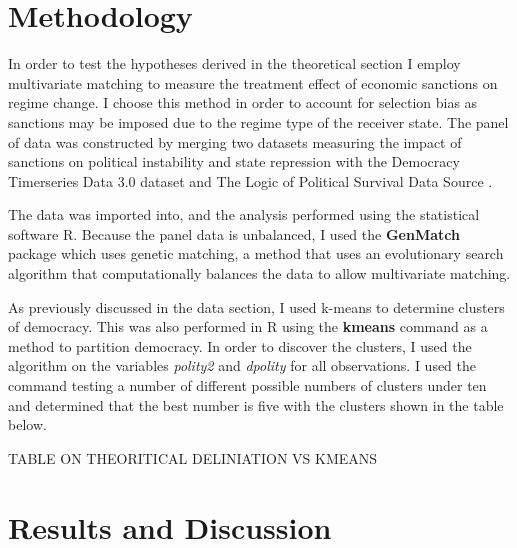 \documentclass[a4paper]{article}\usepackage[]{graphicx}\usepackage[]{color}
\begin{document}
\section*{\large{Methodology}}
In order to test the hypotheses derived in the theoretical section I employ multivariate matching to measure the treatment effect of economic sanctions on regime change. I choose this method in order to account for selection bias as sanctions may be imposed due to the regime type of the receiver state. The panel of data was constructed by merging two datasets measuring the impact of sanctions on political instability \citep{marinov2005economic} and state repression \citep{wood2008hand} with the Democracy Timerseries Data 3.0 dataset \citep{norris2008driving} and The Logic of Political Survival Data Source \citep{smith2005logic}. 
\par
The data was imported into, and the analysis performed using the statistical software R. Because the panel data is unbalanced, I used the \textbf{GenMatch} package which uses genetic matching, a method that uses an evolutionary search algorithm that computationally balances the data to allow multivariate matching\citep{diamond2013genetic}. 
\par
As previously discussed in the data section, I used k-means to determine clusters of democracy. This was also performed in R using the \textbf{kmeans} command as a method to partition democracy. In order to discover the clusters, I used the algorithm on the variables \textit{polity2} and \textit{dpolity} for all observations. I used the command testing a number of different possible numbers of clusters under ten and determined that the best number is five with the clusters shown in the table below. 
\par

TABLE ON THEORITICAL DELINIATION VS KMEANS


\section*{\large{Results and Discussion}}
\end{document}
